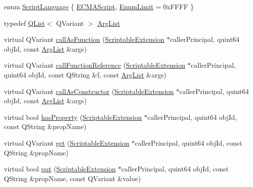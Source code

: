 \begin{DoxyCompactItemize}
\item 
enum \hyperlink{classKParts_1_1ScriptableExtension_ae24e9c2e1e132201ddc092b8b069be23}{Script\+Language} \{ \hyperlink{classKParts_1_1ScriptableExtension_ae24e9c2e1e132201ddc092b8b069be23a53f57a3152be4d9428e8ee66c0614882}{E\+C\+M\+A\+Script}, 
\hyperlink{classKParts_1_1ScriptableExtension_ae24e9c2e1e132201ddc092b8b069be23a0609cfd03f0802c4af4ccae88f385f67}{Enum\+Limit} = 0x\+F\+F\+F\+F
 \}
\item 
typedef \hyperlink{classQList}{Q\+List}$<$ Q\+Variant $>$ \hyperlink{classKParts_1_1ScriptableExtension_a6a35540990153f08b6dcf55d4b504c02}{Arg\+List}
\item 
virtual Q\+Variant \hyperlink{classKParts_1_1ScriptableExtension_a77efc2bc6776fd1e75b1e1a971eed643}{call\+As\+Function} (\hyperlink{classKParts_1_1ScriptableExtension}{Scriptable\+Extension} $\ast$caller\+Principal, quint64 obj\+Id, const \hyperlink{classKParts_1_1ScriptableExtension_a6a35540990153f08b6dcf55d4b504c02}{Arg\+List} \&args)
\item 
virtual Q\+Variant \hyperlink{classKParts_1_1ScriptableExtension_a5fa3ad1c1fe03543b0c03884dc71c8da}{call\+Function\+Reference} (\hyperlink{classKParts_1_1ScriptableExtension}{Scriptable\+Extension} $\ast$caller\+Principal, quint64 obj\+Id, const Q\+String \&f, const \hyperlink{classKParts_1_1ScriptableExtension_a6a35540990153f08b6dcf55d4b504c02}{Arg\+List} \&args)
\item 
virtual Q\+Variant \hyperlink{classKParts_1_1ScriptableExtension_a9cb5d813d297719d8ee00fa703ece547}{call\+As\+Constructor} (\hyperlink{classKParts_1_1ScriptableExtension}{Scriptable\+Extension} $\ast$caller\+Principal, quint64 obj\+Id, const \hyperlink{classKParts_1_1ScriptableExtension_a6a35540990153f08b6dcf55d4b504c02}{Arg\+List} \&args)
\item 
virtual bool \hyperlink{classKParts_1_1ScriptableExtension_a5f1fce8473702a961d49957c307e7e67}{has\+Property} (\hyperlink{classKParts_1_1ScriptableExtension}{Scriptable\+Extension} $\ast$caller\+Principal, quint64 obj\+Id, const Q\+String \&prop\+Name)
\item 
virtual Q\+Variant \hyperlink{classKParts_1_1ScriptableExtension_a90f5b0047ddb0b78096cab68a40c6326}{get} (\hyperlink{classKParts_1_1ScriptableExtension}{Scriptable\+Extension} $\ast$caller\+Principal, quint64 obj\+Id, const Q\+String \&prop\+Name)
\item 
virtual bool \hyperlink{classKParts_1_1ScriptableExtension_ad7cbeb6e9c0a92909e83d71e0646b5cd}{put} (\hyperlink{classKParts_1_1ScriptableExtension}{Scriptable\+Extension} $\ast$caller\+Principal, quint64 obj\+Id, const Q\+String \&prop\+Name, const Q\+Variant \&value)

\end{DoxyCompactItemize}
